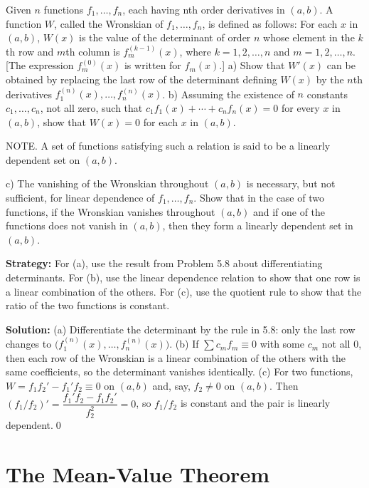 \begin{problembox}
Given \( n \) functions \( f_1, \ldots, f_n \), each having nth order derivatives in \( (a, b) \). A function \( W \), called the Wronskian of \( f_1, \ldots, f_n \), is defined as follows: For each \( x \) in \( (a, b) \), \( W(x) \) is the value of the determinant of order \( n \) whose element in the \( k \)th row and \( m \)th column is \( f_m^{(k-1)}(x) \), where \( k = 1, 2, \ldots, n \) and \( m = 1, 2, \ldots, n \). [The expression \( f_m^{(0)}(x) \) is written for \( f_m(x) \).]
a) Show that \( W'(x) \) can be obtained by replacing the last row of the determinant defining \( W(x) \) by the \( n \)th derivatives \( f_1^{(n)}(x), \ldots, f_n^{(n)}(x) \).
b) Assuming the existence of \( n \) constants \( c_1, \ldots, c_n \), not all zero, such that \( c_1 f_1(x) + \cdots + c_n f_n(x) = 0 \) for every \( x \) in \( (a, b) \), show that \( W(x) = 0 \) for each \( x \) in \( (a, b) \).

NOTE. A set of functions satisfying such a relation is said to be a linearly dependent set on \( (a, b) \).

c) The vanishing of the Wronskian throughout \( (a, b) \) is necessary, but not sufficient, for linear dependence of \( f_1, \ldots, f_n \). Show that in the case of two functions, if the Wronskian vanishes throughout \( (a, b) \) and if one of the functions does not vanish in \( (a, b) \), then they form a linearly dependent set in \( (a, b) \).
\end{problembox}

\noindent\textbf{Strategy:} For (a), use the result from Problem 5.8 about differentiating determinants. For (b), use the linear dependence relation to show that one row is a linear combination of the others. For (c), use the quotient rule to show that the ratio of the two functions is constant.

\bigskip\noindent\textbf{Solution:}
(a) Differentiate the determinant by the rule in 5.8: only the last row changes to $\big(f_1^{(n)}(x),\dots,f_n^{(n)}(x)\big)$. (b) If $\sum c_m f_m\equiv 0$ with some $c_m$ not all $0$, then each row of the Wronskian is a linear combination of the others with the same coefficients, so the determinant vanishes identically. (c) For two functions, $W=f_1 f_2'-f_1'f_2\equiv 0$ on $(a,b)$ and, say, $f_2\ne 0$ on $(a,b)$. Then $(f_1/f_2)'=\dfrac{f_1'f_2-f_1 f_2'}{f_2^2}=0$, so $f_1/f_2$ is constant and the pair is linearly dependent.\qed

\section{The Mean-Value Theorem}

